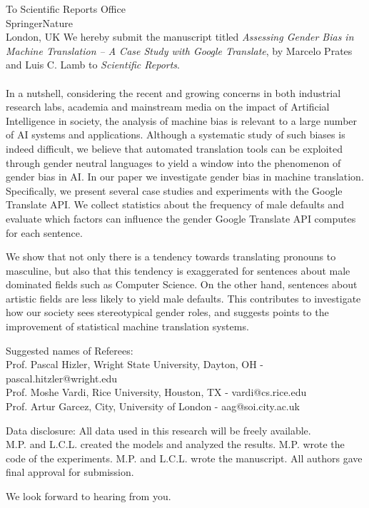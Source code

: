 \documentclass[10pt]{letter} %
\begin{document}
\begin{letter}{To Scientific Reports Office\\
SpringerNature\\
London, UK
 }
We hereby submit the manuscript titled \emph{Assessing Gender Bias in Machine Translation -- A Case Study with Google Translate}, by Marcelo Prates and Luis C. Lamb to \emph{Scientific Reports}. \\
\\
In a nutshell, considering the recent and growing concerns in both industrial research labs,
academia and mainstream media on the impact of Artificial Intelligence in society, the analysis of  machine bias is relevant to a large number of AI systems and applications.  
Although a systematic study of such biases is indeed difficult, we believe that automated translation tools can be exploited through gender neutral languages to yield a window into the phenomenon of 
gender bias in AI.  
In our paper we investigate gender bias in machine translation. Specifically, we present several case studies and experiments with the Google Translate API. We collect statistics about the frequency of male defaults and evaluate which factors can influence the gender Google Translate API computes for each sentence. 

We show that not only there is a tendency towards translating pronouns to masculine, but also that this tendency is exaggerated for sentences about male dominated fields such as Computer Science. On the other hand, sentences about artistic fields are less likely to yield male defaults. This contributes to investigate how our society sees stereotypical gender roles, and suggests points to the improvement of   statistical machine translation systems. 

Suggested names of Referees: \\
Prof. Pascal Hizler, Wright State University, Dayton, OH -  pascal.hitzler@wright.edu \\
Prof. Moshe Vardi, Rice University, Houston, TX - vardi@cs.rice.edu\\
Prof. Artur Garcez, City, University of London - aag@soi.city.ac.uk

Data disclosure: All data used in this research will be freely available.\\
M.P. and L.C.L. created the models and analyzed the results. M.P. wrote the code
of the experiments.
M.P. and L.C.L. wrote the manuscript. All authors gave final approval for submission.

We look forward to hearing from you.\\ \ \\ \ \\ \ \\



\end{letter}
\end{document}
